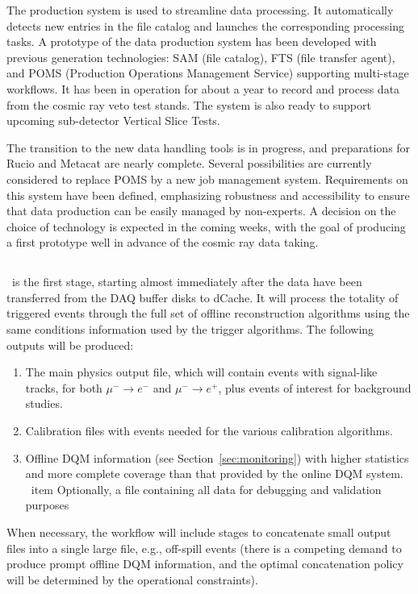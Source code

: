 The production system is used to streamline data processing. It automatically detects new entries in the file catalog and launches the corresponding processing tasks. A prototype of the data production system has been developed with previous generation technologies: SAM (file catalog), FTS (file transfer agent), and POMS (Production Operations Management Service) supporting multi-stage workflows. It has been in operation for about a year to record and process data from the cosmic ray veto test stands. The system is also ready to support upcoming sub-detector Vertical Slice Tests. 

The transition to the new data handling tools is in progress, and  preparations for Rucio and Metacat are nearly complete. Several possibilities are currently considered to replace POMS by a new job management system. Requirements on this system have been defined, emphasizing robustness and accessibility to ensure that data production can be easily managed by non-experts. A decision on the choice of technology is expected in the coming weeks, with the goal of producing a first prototype well in advance of the cosmic ray data taking.    


\subsection{\passone}
\passone\ is the first stage, starting almost immediately after the data have been transferred from the DAQ buffer disks to dCache. It will process the totality of triggered events through the full set of offline reconstruction algorithms using the same conditions information used by the trigger algorithms. The following outputs will be produced:
\begin{enumerate}
 \item The main physics output file, which will contain events with signal-like tracks, for both $\mu^-\to e^-$ and $\mu^-\to e^+$, plus events of interest for background studies.
 \item Calibration files with events needed for the various calibration algorithms.
 \item Offline DQM information (see Section~\ref{sec:monitoring}) with higher statistics and more complete coverage than that provided by the online DQM system.
 \ item Optionally, a file containing all data for debugging and validation purposes
\end{enumerate}
When necessary, the workflow will include stages to concatenate small output files into a single large file, e.g., off-spill events (there is a competing demand to produce prompt offline DQM information, and the optimal concatenation policy will be determined by the operational constraints).

